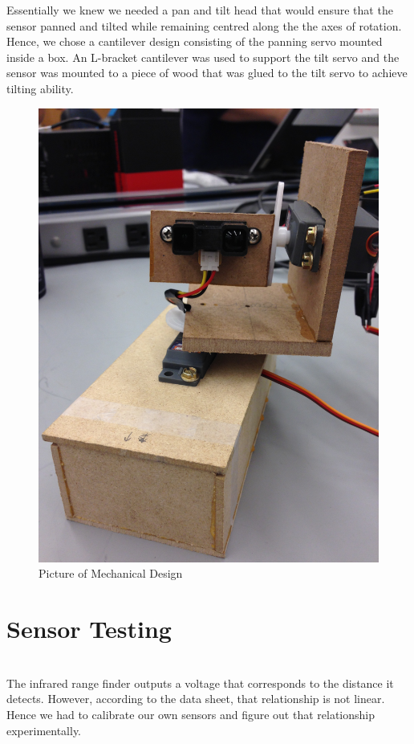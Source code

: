 \documentclass{article}
\begin{document}
Essentially we knew we needed a pan and tilt head that would ensure that the sensor panned and tilted while remaining centred along the the axes of rotation. Hence, we chose a cantilever design consisting of the panning servo mounted inside a box. An L-bracket cantilever was used to support the tilt servo and the sensor was mounted to a piece of wood that was glued to the tilt servo to achieve tilting ability. \\
%
\begin{figure}[h!]
\begin{center}
\includegraphics[scale=0.08, angle=270]{mechanism.JPG}
\caption{Picture of Mechanical Design}
\end{center}
\end{figure}
%
\section{Sensor Testing} \ \\
The infrared range finder outputs a voltage that corresponds to the distance it detects. However, according to the data sheet, that relationship is not linear. Hence we had to calibrate our own sensors and figure out that relationship experimentally. \\
\end{document}
